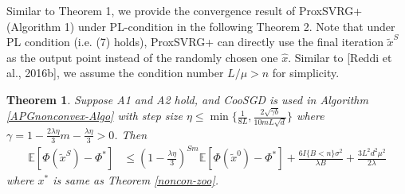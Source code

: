 \documentclass{article}
\newcommand*{\E}{\mathbb{E}}
\newtheorem{theorem}{Theorem}[section]
\theoremstyle{definition}
\theoremstyle{remark}
\begin{document}
{\color{Violet}
Similar to Theorem 1, we provide the convergence result of ProxSVRG+ (Algorithm 1) under PL-condition in the
following Theorem 2. Note that under PL condition (i.e. (7) holds), ProxSVRG+ can directly use the final iteration $\widetilde{x}^S$
as the output point instead of the randomly chosen
one $\hat{x}$. Similar to [Reddi et al., 2016b],
we assume the condition number $L/\mu > n$ for simplicity.
}

\begin{theorem}\label{PL-Zoo}
Suppose  A1  and  A2  hold, and  CooSGD  is  used  in
 Algorithm \ref{APGnonconvex-Algo} with step size $\eta \leq \min\{\frac{1}{8L}, \frac{2\sqrt{\gamma b}}{10 m L \sqrt{d}}\}$ where $\gamma = 1-\frac{2\lambda\eta}{3} m-\frac{\lambda\eta}{3} > 0$. Then 
\begin{equation}
\begin{split}
\E[\Phi(\widetilde{x}^S) - {\Phi}^*] & \leq   \left(1-\frac{\lambda\eta}{3}\right)^{Sm} \E[\Phi(\widetilde{x}^0) - {\Phi}^*] + \frac{6I\{B < n\} \sigma ^2}{\lambda B}+\frac{3 L^2 d^2 \mu^2}{2\lambda}
\end{split}
\end{equation}
where $x^*$ is same as Theorem \ref{noncon-zoo}.
\end{theorem}
\end{document}
